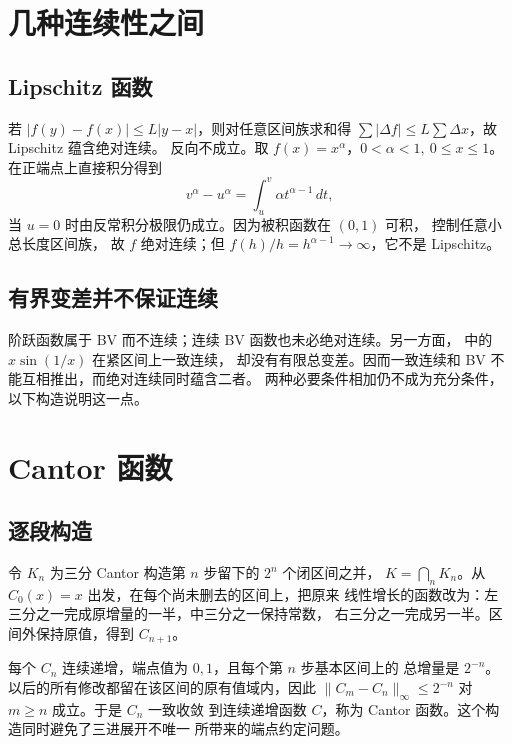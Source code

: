 \section{几种连续性之间}

\subsection{Lipschitz 函数}

若 \(|f(y)-f(x)|\le L|y-x|\)，则对任意区间族求和得
\(\sum|\Delta f|\le L\sum\Delta x\)，故 Lipschitz 蕴含绝对连续。
反向不成立。取 \(f(x)=x^\alpha\)，\(0<\alpha<1,\ 0\le x\le1\)。
在正端点上直接积分得到
\[
 v^\alpha-u^\alpha=\int_u^v\alpha t^{\alpha-1}\,dt,
\]
当 \(u=0\) 时由反常积分极限仍成立。因为被积函数在 \((0,1)\) 可积，
控制任意小总长度区间族，
故 \(f\) 绝对连续；但 \(f(h)/h=h^{\alpha-1}\to\infty\)，它不是 Lipschitz。

\subsection{有界变差并不保证连续}

阶跃函数属于 BV 而不连续；连续 BV 函数也未必绝对连续。另一方面，
中的 \(x\sin(1/x)\) 在紧区间上一致连续，
却没有有限总变差。因而一致连续和 BV 不能互相推出，而绝对连续同时蕴含二者。
两种必要条件相加仍不成为充分条件，以下构造说明这一点。

\section{Cantor 函数}

\subsection{逐段构造}

令 \(K_n\) 为三分 Cantor 构造第 \(n\) 步留下的 \(2^n\) 个闭区间之并，
\(K=\bigcap_nK_n\)。从 \(C_0(x)=x\) 出发，在每个尚未删去的区间上，把原来
线性增长的函数改为：左三分之一完成原增量的一半，中三分之一保持常数，
右三分之一完成另一半。区间外保持原值，得到 \(C_{n+1}\)。

每个 \(C_n\) 连续递增，端点值为 \(0,1\)，且每个第 \(n\) 步基本区间上的
总增量是 \(2^{-n}\)。以后的所有修改都留在该区间的原有值域内，因此
\(\|C_m-C_n\|_\infty\le2^{-n}\) 对 \(m\ge n\) 成立。于是 \(C_n\) 一致收敛
到连续递增函数 \(C\)，称为 Cantor 函数。这个构造同时避免了三进展开不唯一
所带来的端点约定问题。

